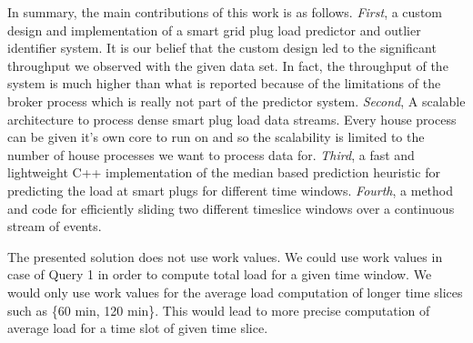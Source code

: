 In summary, the main contributions of this work is as follows. \textit{First}, a custom design and implementation of a smart grid plug load predictor and outlier identifier system. It is our belief that the custom design led to the significant throughput we observed with the given data set. In fact, the throughput of the system is much higher than what is reported because of the limitations of the broker process which is really not part of the predictor system. \textit{Second}, A scalable architecture to process dense smart plug load data streams. Every house process can be given it's own core to run on and so the scalability is limited to the number of house processes we want to process data for. \textit{Third}, a fast and lightweight C++ implementation of the median based prediction heuristic for predicting the load at smart plugs for different time windows. \textit{Fourth}, a method and code for efficiently sliding two different timeslice windows over a continuous stream of events.

The presented solution does not use work values.
We could use work values in case of Query 1 in order to compute total load for a given time window.
We would only use work values for the average load computation of longer time slices such as \{60 min, 120 min\}. This would lead to more precise computation of average load for a time slot of given time slice.
